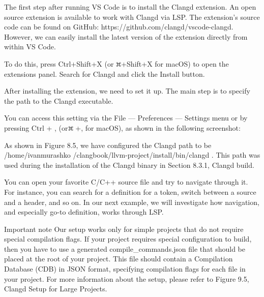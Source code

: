 The first step after running VS Code is to install the Clangd extension. An open source extension is available to work with Clangd via LSP. The extension’s source code can be found on GitHub: https://github.com/clangd/vscode-clangd. However, we can easily install the latest version of the extension directly from within VS Code.

To do this, press Ctrl+Shift+X (or \includegraphics[width=0.02\textwidth]{content/part2/chapter8/images/3.png}+Shift+X for macOS) to open the extensions panel. Search for Clangd and click the Install button.


After installing the extension, we need to set it up. The main step is to specify the path to the Clangd executable.

You can access this setting via the File — Preferences — Settings menu or by pressing Ctrl + , (or\includegraphics[width=0.02\textwidth]{content/part2/chapter8/images/3.png} +, for macOS), as shown in the following screenshot:


As shown in Figure 8.5, we have configured the Clangd path to be /home/ivanmurashko /clangbook/llvm-project/install/bin/clangd . This path was used during the installation of the Clangd binary in Section 8.3.1, Clangd build.

You can open your favorite C/C++ source file and try to navigate through it. For instance, you can search for a definition for a token, switch between a source and a header, and so on. In our next example, we will investigate how navigation, and especially go-to definition, works through LSP.

\begin{myNotic}{Important note}
Our setup works only for simple projects that do not require special compilation flags. If your project requires special configuration to build, then you have to use a generated compile\_commands.json file that should be placed at the root of your project. This file should contain a Compilation Database (CDB) in JSON format, specifying compilation flags for each file in your project. For more information about the setup, please refer to Figure 9.5, Clangd Setup for Large Projects.
\end{myNotic}

